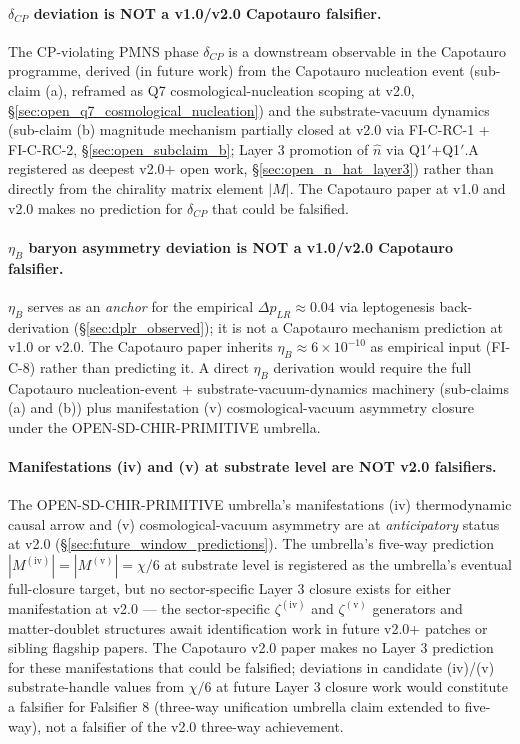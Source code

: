 \documentclass[11pt,letterpaper]{article}
\newcommand{\DeltapLR}{\Delta p_{LR}}
\begin{document}
\paragraph{$\delta_{CP}$ deviation is NOT a v1.0/v2.0 Capotauro falsifier.}
The CP-violating PMNS phase $\delta_{CP}$ is a downstream observable in the Capotauro programme, derived (in future work) from the Capotauro nucleation event (sub-claim (a), reframed as Q7 cosmological-nucleation scoping at v2.0, \S\ref{sec:open_q7_cosmological_nucleation}) and the substrate-vacuum dynamics (sub-claim (b) magnitude mechanism partially closed at v2.0 via FI-C-RC-1 + FI-C-RC-2, \S\ref{sec:open_subclaim_b}; Layer 3 promotion of $\hat{n}$ via Q1$'$+Q1$'$.A registered as deepest v2.0+ open work, \S\ref{sec:open_n_hat_layer3}) rather than directly from the chirality matrix element $|M|$. The Capotauro paper at v1.0 and v2.0 makes no prediction for $\delta_{CP}$ that could be falsified.

\paragraph{$\eta_B$ baryon asymmetry deviation is NOT a v1.0/v2.0 Capotauro falsifier.}
$\eta_B$ serves as an \emph{anchor} for the empirical $\DeltapLR \approx 0.04$ via leptogenesis back-derivation (\S\ref{sec:dplr_observed}); it is not a Capotauro mechanism prediction at v1.0 or v2.0. The Capotauro paper inherits $\eta_B \approx 6 \times 10^{-10}$ as empirical input (FI-C-8) rather than predicting it. A direct $\eta_B$ derivation would require the full Capotauro nucleation-event + substrate-vacuum-dynamics machinery (sub-claims (a) and (b)) plus manifestation (v) cosmological-vacuum asymmetry closure under the OPEN-SD-CHIR-PRIMITIVE umbrella.

\paragraph{Manifestations (iv) and (v) at substrate level are NOT v2.0 falsifiers.}
The OPEN-SD-CHIR-PRIMITIVE umbrella's manifestations (iv) thermodynamic causal arrow and (v) cosmological-vacuum asymmetry are at \emph{anticipatory} status at v2.0 (\S\ref{sec:future_window_predictions}). The umbrella's five-way prediction $|M^{(\text{iv})}| = |M^{(\text{v})}| = \chi/6$ at substrate level is registered as the umbrella's eventual full-closure target, but no sector-specific Layer 3 closure exists for either manifestation at v2.0 --- the sector-specific $\zeta^{(\text{iv})}$ and $\zeta^{(\text{v})}$ generators and matter-doublet structures await identification work in future v2.0+ patches or sibling flagship papers. The Capotauro v2.0 paper makes no Layer 3 prediction for these manifestations that could be falsified; deviations in candidate (iv)/(v) substrate-handle values from $\chi/6$ at future Layer 3 closure work would constitute a falsifier for Falsifier 8 (three-way unification umbrella claim extended to five-way), not a falsifier of the v2.0 three-way achievement.
\end{document}
